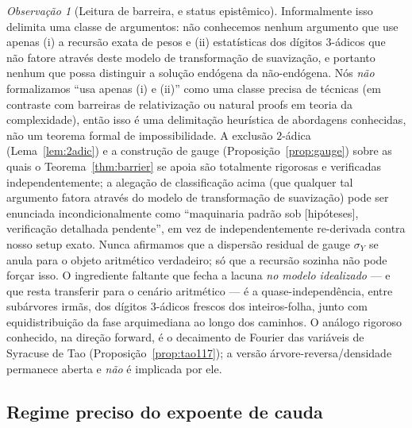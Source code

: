 \documentclass[11pt]{article}
\theoremstyle{definition}
\theoremstyle{remark}
\newtheorem{remark}[theorem]{Observação}
\begin{document}
\begin{remark}[Leitura de barreira, e status epistêmico]\label{rem:barrier-reading}
Informalmente isso delimita uma classe de argumentos: não conhecemos
nenhum argumento que use apenas \textup{(i)} a recursão exata de pesos
e \textup{(ii)} estatísticas dos dígitos $3$-ádicos que não fatore
através deste modelo de transformação de suavização, e portanto nenhum
que possa distinguir a solução endógena da não-endógena. Nós \emph{não}
formalizamos ``usa apenas (i) e (ii)'' como uma classe precisa de
técnicas (em contraste com barreiras de relativização ou natural
proofs em teoria da complexidade), então isso é uma delimitação
heurística de abordagens conhecidas, não um teorema formal de
impossibilidade. A exclusão $2$-ádica (Lema~\ref{lem:2adic}) e a
construção de gauge (Proposição~\ref{prop:gauge}) sobre as quais o
Teorema~\ref{thm:barrier} se apoia são totalmente rigorosas e
verificadas independentemente; a alegação de classificação acima (que
qualquer tal argumento fatora através do modelo de transformação de
suavização) pode ser enunciada incondicionalmente como ``maquinaria
padrão sob [hipóteses], verificação detalhada pendente'', em vez de
independentemente re-derivada contra nosso setup exato. Nunca afirmamos
que a dispersão residual de gauge $\sigma_Y$ se anula para o objeto
aritmético verdadeiro; só que a recursão sozinha não pode forçar isso.
O ingrediente faltante que fecha a lacuna \emph{no modelo idealizado}
--- e que resta transferir para o cenário aritmético --- é a
quase-independência, entre subárvores irmãs, dos dígitos $3$-ádicos
frescos dos inteiros-folha, junto com equidistribuição da fase
arquimediana ao longo dos caminhos. O análogo rigoroso conhecido, na
direção forward, é o decaimento de Fourier das variáveis de Syracuse
de Tao (Proposição~\ref{prop:tao117}); a versão árvore-reversa/densidade
permanece aberta e \emph{não} é implicada por ele.
\end{remark}

\subsection{Regime preciso do expoente de cauda}
\label{sec:endogeny-addendum}
\end{document}
